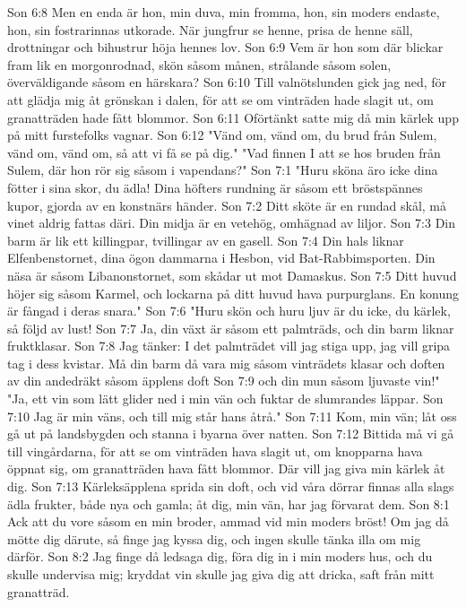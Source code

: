 Son 6:8  Men en enda är hon, min duva, min fromma, hon, sin moders endaste, hon, sin fostrarinnas utkorade. När jungfrur se henne, prisa de henne säll, drottningar och bihustrur höja hennes lov.
Son 6:9  Vem är hon som där blickar fram lik en morgonrodnad, skön såsom månen, strålande såsom solen, överväldigande såsom en härskara?
Son 6:10  Till valnötslunden gick jag ned, för att glädja mig åt grönskan i dalen, för att se om vinträden hade slagit ut, om granatträden hade fått blommor.
Son 6:11  Oförtänkt satte mig då min kärlek upp på mitt furstefolks vagnar.
Son 6:12  "Vänd om, vänd om, du brud från Sulem, vänd om, vänd om, så att vi få se på dig." "Vad finnen I att se hos bruden från Sulem, där hon rör sig såsom i vapendans?"
Son 7:1  "Huru sköna äro icke dina fötter i sina skor, du ädla! Dina höfters rundning är såsom ett bröstspännes kupor, gjorda av en konstnärs händer.
Son 7:2  Ditt sköte är en rundad skål, må vinet aldrig fattas däri. Din midja är en vetehög, omhägnad av liljor.
Son 7:3  Din barm är lik ett killingpar, tvillingar av en gasell.
Son 7:4  Din hals liknar Elfenbenstornet, dina ögon dammarna i Hesbon, vid Bat-Rabbimsporten. Din näsa är såsom Libanonstornet, som skådar ut mot Damaskus.
Son 7:5  Ditt huvud höjer sig såsom Karmel, och lockarna på ditt huvud hava purpurglans. En konung är fångad i deras snara."
Son 7:6  "Huru skön och huru ljuv är du icke, du kärlek, så följd av lust!
Son 7:7  Ja, din växt är såsom ett palmträds, och din barm liknar fruktklasar.
Son 7:8  Jag tänker: I det palmträdet vill jag stiga upp, jag vill gripa tag i dess kvistar. Må din barm då vara mig såsom vinträdets klasar och doften av din andedräkt såsom äpplens doft
Son 7:9  och din mun såsom ljuvaste vin!" "Ja, ett vin som lätt glider ned i min vän och fuktar de slumrandes läppar.
Son 7:10  Jag är min väns, och till mig står hans åtrå."
Son 7:11  Kom, min vän; låt oss gå ut på landsbygden och stanna i byarna över natten.
Son 7:12  Bittida må vi gå till vingårdarna, för att se om vinträden hava slagit ut, om knopparna hava öppnat sig, om granatträden hava fått blommor. Där vill jag giva min kärlek åt dig.
Son 7:13  Kärleksäpplena sprida sin doft, och vid våra dörrar finnas alla slags ädla frukter, både nya och gamla; åt dig, min vän, har jag förvarat dem.
Son 8:1  Ack att du vore såsom en min broder, ammad vid min moders bröst! Om jag då mötte dig därute, så finge jag kyssa dig, och ingen skulle tänka illa om mig därför.
Son 8:2  Jag finge då ledsaga dig, föra dig in i min moders hus, och du skulle undervisa mig; kryddat vin skulle jag giva dig att dricka, saft från mitt granatträd.
